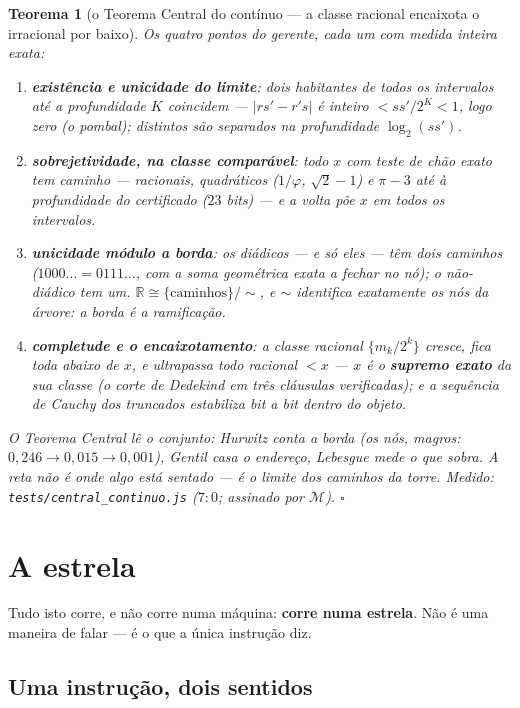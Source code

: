 \documentclass[11pt,a4paper]{article}
\newcommand{\code}[1]{\texttt{\small #1}}
\newtheorem{teorema}{Teorema}
\begin{document}
\begin{teorema}[o Teorema Central do contínuo --- a classe racional
encaixota o irracional por baixo]\label{thm:central-continuo}
Os quatro pontos do gerente, cada um com medida inteira exata:
\begin{enumerate}
\item \textbf{existência e unicidade do limite}: dois habitantes de
todos os intervalos até a profundidade $K$ coincidem ---
$|rs'-r's|$ é inteiro $<ss'/2^{K}<1$, logo \emph{zero} (o pombal);
distintos são separados na profundidade $\log_{2}(ss')$.
\item \textbf{sobrejetividade, na classe comparável}: todo $x$ com
teste de chão exato tem caminho --- racionais, quadráticos ($1/\varphi$,
$\sqrt2-1$) e $\pi-3$ até à profundidade do certificado ($23$ bits) ---
e a \emph{volta} põe $x$ em todos os intervalos.
\item \textbf{unicidade módulo a borda}: os diádicos --- e só eles ---
têm \emph{dois} caminhos ($1000\ldots=0111\ldots$, com a soma
geométrica exata a fechar no nó); o não-diádico tem um.
$\mathbb{R}\cong\{\text{caminhos}\}/\!\sim$, e $\sim$ identifica
exatamente \emph{os nós da árvore}: a borda é a ramificação.
\item \textbf{completude e o encaixotamento}: a classe racional
$\{m_{k}/2^{k}\}$ \emph{cresce}, fica \emph{toda abaixo} de $x$, e
\emph{ultrapassa todo racional} $<x$ --- $x$ é o \textbf{supremo
exato} da sua classe (o corte de Dedekind em três cláusulas
verificadas); e a sequência de Cauchy dos truncados estabiliza bit a
bit \emph{dentro} do objeto.
\end{enumerate}
O Teorema Central lê o conjunto: Hurwitz \emph{conta} a borda (os
nós, magros: $0{,}246\to0{,}015\to0{,}001$), Gentil \emph{casa} o
endereço, Lebesgue \emph{mede} o que sobra. \emph{A reta não é onde
algo está sentado --- é o limite dos caminhos da torre.}
\emph{Medido:} \code{tests/central\_continuo.js} ($7{:}0$; assinado
por $\mathcal{M}$).
$\square$
\end{teorema}

\section{A estrela}\label{sec:estrela}

Tudo isto corre, e não corre numa máquina: \textbf{corre numa estrela}. Não é uma maneira de falar
--- é o que a única instrução diz.

\subsection*{Uma instrução, dois sentidos}
\end{document}
